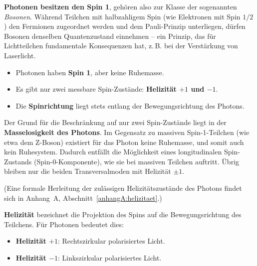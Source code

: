 \vspace{0.5em}
\textbf{Photonen besitzen den Spin 1}, gehören also zur Klasse der sogenannten \textit{Bosonen}. Während Teilchen mit halbzahligem Spin (wie Elektronen mit Spin $1/2$) den Fermionen zugeordnet werden und dem Pauli-Prinzip unterliegen, dürfen Bosonen denselben Quantenzustand einnehmen – ein Prinzip, das für Lichtteilchen fundamentale Konsequenzen hat, z.\,B. bei der Verstärkung von Laserlicht.
\medskip
\begin{tcolorbox}[physikbox, title=Eigenschaften des Photon-Spins]
	\label{box:Eigenschaften des}
	\begin{itemize}
		\item Photonen haben \textbf{Spin 1}, aber keine Ruhemasse.
		\item Es gibt nur zwei messbare Spin-Zustände: \textbf{Helizität $+1$ und $-1$}.
		\item Die \textbf{Spinrichtung} liegt stets entlang der Bewegungsrichtung des Photons.
	\end{itemize}
\end{tcolorbox}
\medskip
Der Grund für die Beschränkung auf nur zwei Spin-Zustände liegt in der \textbf{Masselosigkeit des Photons}. Im Gegensatz zu massiven Spin-1-Teilchen (wie etwa dem Z-Boson) existiert für das Photon keine Ruhemasse, und somit auch kein Ruhesystem. Dadurch entfällt die Möglichkeit eines longitudinalen Spin-Zustands (Spin-0-Komponente), wie sie bei massiven Teilchen auftritt. Übrig bleiben nur die beiden Transversalmoden mit Helizität $\pm1$.

(Eine formale Herleitung der zulässigen Helizitätszustände des Photons findet sich in Anhang~A, Abschnitt~\ref{anhangA:helizitaet}.)


\textbf{Helizität} bezeichnet die Projektion des Spins auf die Bewegungsrichtung des Teilchens. Für Photonen bedeutet dies:
\begin{itemize}
	\item \textbf{Helizität $+1$}: Rechtszirkular polarisiertes Licht.
	\item \textbf{Helizität $-1$}: Linkszirkular polarisiertes Licht.
\end{itemize}


